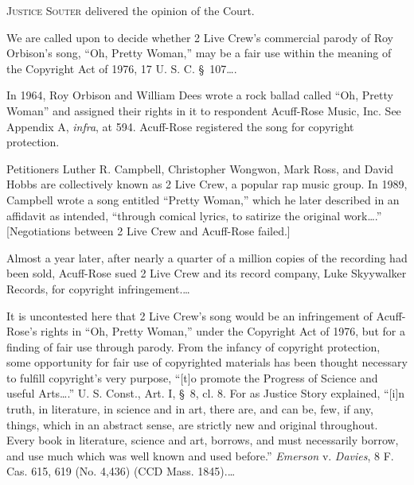  

\opinion \textsc{Justice Souter} delivered the opinion of the Court.

We are called upon to decide whether 2 Live Crew's commercial parody of Roy
Orbison's song, ``Oh, Pretty Woman,'' may be a fair use within the meaning of
the Copyright Act of 1976, 17 U. S. C. \S~107\ldots.


In 1964, Roy Orbison and William Dees wrote a rock ballad called ``Oh, Pretty
Woman'' and assigned their rights in it to respondent Acuff-Rose Music, Inc. See
Appendix A, \textit{infra}, at 594. Acuff-Rose registered the song for copyright
protection.

Petitioners Luther R. Campbell, Christopher Wongwon, Mark Ross, and David Hobbs
are collectively known as 2 Live Crew, a popular rap music
group. In 1989, Campbell wrote a song
entitled ``Pretty Woman,'' which he later described in an affidavit as intended,
``through comical lyrics, to satirize the original work\ldots.''
[Negotiations between 2 Live Crew and Acuff-Rose failed.]

Almost a year later, after nearly a quarter of a million copies of the recording
had been sold, Acuff-Rose sued 2 Live Crew and its record company, Luke
Skyywalker Records, for copyright infringement.\ldots


It is uncontested here that 2 Live Crew's song would be an infringement of
Acuff-Rose's rights in ``Oh, Pretty Woman,'' under the Copyright Act of 1976,
but for a finding of fair use through parody. From the infancy of copyright
protection, some opportunity for fair use of copyrighted materials has been
thought necessary to fulfill copyright's very purpose, ``[t]o promote the
Progress of Science and useful Arts\ldots.'' U. S. Const., Art. I, \S~8, cl.
8.
For as Justice Story explained, ``[i]n truth, in literature, in science
and in art, there are, and can be, few, if any, things, which in an abstract
sense, are strictly new and original throughout. Every book in literature,
science and art, borrows, and must necessarily borrow, and use much which was
well known and used before.'' \textit{Emerson} v. \textit{Davies}, 8 F. Cas.
615, 619 (No. 4,436) (CCD Mass. 1845).\ldots

